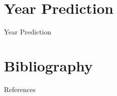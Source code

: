 \documentclass{beamer}
\begin{document}
\section{Year Prediction}

\begin{frame}{Year Prediction}
\end{frame}

\section{Bibliography}

\begin{frame}[allowframebreaks]{References}

\nocite{*}
\printbibliography[heading=none]

\end{frame}

\thankframe
\end{document}
